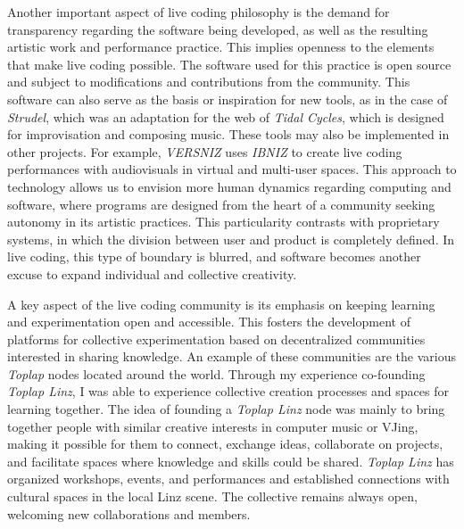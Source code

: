 \documentclass[12pt, twoside, a4paper]{report}
\begin{document}

Another important aspect of live coding philosophy is the demand for transparency regarding the software being developed, as well as the resulting artistic work and performance practice. This implies openness to the elements that make live coding possible. The software used for this practice is open source and subject to modifications and contributions from the community. This software can also serve as the basis or inspiration for new tools, as in the case of \textit{Strudel}, which was an adaptation for the web of \textit{Tidal Cycles}, which is designed for improvisation and composing music. These tools may also be implemented in other projects. For example, \textit{VERSNIZ} uses \textit{IBNIZ} to create live coding performances with audiovisuals in virtual and multi-user spaces. This approach to technology allows us to envision more human dynamics regarding computing and software, where programs are designed from the heart of a community seeking autonomy in its artistic practices. This particularity contrasts with proprietary systems, in which the division between user and product is completely defined. In live coding, this type of boundary is blurred, and software becomes another excuse to expand individual and collective creativity.  

A key aspect of the live coding community is its emphasis on keeping learning and experimentation open and accessible. This fosters the development of platforms for collective experimentation based on decentralized communities interested in sharing knowledge. An example of these communities are the various \textit{Toplap} nodes located around the world. Through my experience co-founding \textit{Toplap Linz}, I was able to experience collective creation processes and spaces for learning together. The idea of founding a \textit{Toplap Linz} node was mainly to bring together people with similar creative interests in computer music or VJing, making it possible for them to connect, exchange ideas, collaborate on projects, and facilitate spaces where knowledge and skills could be shared. \textit{Toplap Linz} has organized workshops, events, and performances and established connections with cultural spaces in the local Linz scene. The collective remains always open, welcoming new collaborations and members.
\end{document}
